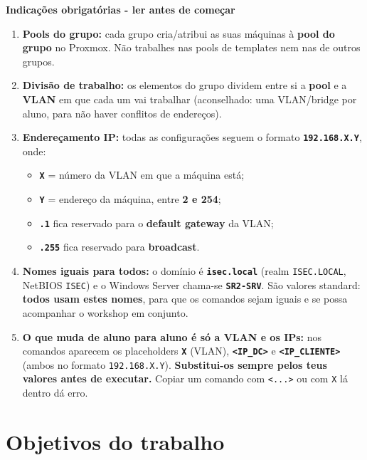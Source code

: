 \documentclass[11pt,a4paper,oneside]{report}
\begin{document}
\begin{avisobox}[title={Atenção}]
\textbf{Indicações obrigatórias - ler antes de começar}

\begin{enumerate}
\item \textbf{Pools do grupo:} cada grupo cria/atribui as suas máquinas à \textbf{pool do grupo} no Proxmox. Não trabalhes nas pools de templates nem nas de outros grupos.
\item \textbf{Divisão de trabalho:} os elementos do grupo dividem entre si a \textbf{pool} e a \textbf{VLAN} em que cada um vai trabalhar (aconselhado: uma VLAN/bridge por aluno, para não haver conflitos de endereços).
\item \textbf{Endereçamento IP:} todas as configurações seguem o formato \textbf{\texttt{192.168.X.Y}}, onde:
\begin{itemize}
\item \textbf{\texttt{X}} = número da VLAN em que a máquina está;
\item \textbf{\texttt{Y}} = endereço da máquina, entre \textbf{2 e 254};
\item \textbf{\texttt{.1}} fica reservado para o \textbf{default gateway} da VLAN;
\item \textbf{\texttt{.255}} fica reservado para \textbf{broadcast}.
\end{itemize}
\item \textbf{Nomes iguais para todos:} o domínio é \textbf{\texttt{isec.local}} (realm \texttt{ISEC.LOCAL}, NetBIOS \texttt{ISEC}) e o Windows Server chama-se \textbf{\texttt{SR2-SRV}}. São valores standard: \textbf{todos usam estes nomes}, para que os comandos sejam iguais e se possa acompanhar o workshop em conjunto.
\item \textbf{O que muda de aluno para aluno é só a VLAN e os IPs:} nos comandos aparecem os placeholders \textbf{\texttt{X}} (VLAN), \textbf{\texttt{\textless{}IP\_DC\textgreater{}}} e \textbf{\texttt{\textless{}IP\_CLIENTE\textgreater{}}} (ambos no formato \texttt{192.168.X.Y}). \textbf{Substitui-os sempre pelos teus valores antes de executar.} Copiar um comando com \texttt{\textless{}...\textgreater{}} ou com \texttt{X} lá dentro dá erro.
\end{enumerate}
\end{avisobox}

\section*{Objetivos do trabalho}
\end{document}
